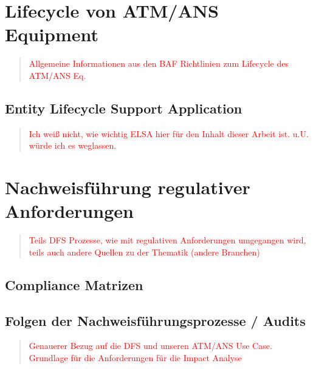        \pagebreak
    \section{Lifecycle von ATM/ANS Equipment}

    \begin{quote}
\textcolor{red}{Allgemeine Informationen aus den BAF Richtlinien zum Lifecycle des ATM/ANS Eq.}
\end{quote}
    
        \subsection{Entity Lifecycle Support Application}

\begin{quote}
\textcolor{red}{Ich weiß nicht, wie wichtig ELSA hier für den Inhalt dieser Arbeit ist. u.U. würde ich es weglassen.}
\end{quote}
    \pagebreak
    \section{Nachweisführung regulativer Anforderungen}

\begin{quote}
\textcolor{red}{Teils DFS Prozesse, wie mit regulativen Anforderungen umgegangen wird, teils auch andere Quellen zu der Thematik (andere Branchen)}
\end{quote}
    
        \subsection{Compliance Matrizen}
        \subsection{Folgen der Nachweisführungsprozesse / Audits}
\begin{quote}
\textcolor{red}{Genauerer Bezug auf die DFS und unseren ATM/ANS Use Case. Grundlage für die Anforderungen für die Impact Analyse}
\end{quote}
        